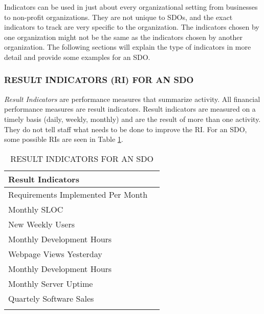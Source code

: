 \documentclass[SDSUThesis.tex]{subfiles}
\begin{document}
        Indicators can be used in just about every organizational
        setting from businesses to non-profit organizations. They
        are not unique to SDOs, and the exact indicators to track
        are very specific to the organization.  The indicators chosen
        by one organization might not be the same as the indicators
        chosen by another organization.  The following sections
        will explain the type of indicators in more detail and provide
        some examples for an SDO.
        
        \subsubsection{RESULT INDICATORS (RI) FOR AN SDO}
            \textit{Result Indicators} are performance 
            measures that summarize activity.  All financial performance
            measures are result indicators.  Result indicators
            are measured on a timely basis (daily, weekly, monthly)
            and are the result of more than one activity.  They do not
            tell staff what needs to be done to improve the RI. For
            an SDO, some possible RIs are seen in Table \ref{tab:RI}.
            
            \begin{longtable}{@{}l l}
                \toprule%
                 \centering%
                 {\bfseries Result Indicators} &
                 \\
                
                \cmidrule[0.4pt](r{0.125em}){1-1}%
                \endhead
                
                Requirements Implemented Per Month  \\
                \myrowcolour%
                Monthly SLOC \\
                New Weekly Users \\
                \myrowcolour%
                Monthly Development Hours \\
                Webpage Views Yesterday \\
                \myrowcolour%
                Monthly Development Hours \\
                Monthly Server Uptime \\
                \myrowcolour%
                Quartely Software Sales \\
                
                \bottomrule
                
                \caption{RESULT INDICATORS FOR AN SDO}
                \label{tab:RI}
            \end{longtable}
            
\end{document}
